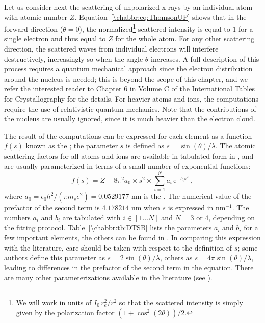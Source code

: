 Let us consider next the scattering of unpolarized x-rays by an individual atom with atomic number $Z$.  Equation~\ref{\chabbr:eq:ThomsonUP} shows that in the forward direction ($\theta=0$), the normalized\footnote{We will work in units of $I_0\,r_e^2/r^2$ so that the scattered intensity is simply given by the polarization factor $(1+\cos^2(2\theta))/2$.} scattered intensity is equal to $1$ for a single electron and thus equal to $Z$ for the whole atom.  For any other scattering direction, the scattered waves from individual electrons will interfere destructively, increasingly so when the angle $\theta$ increases.  A full description of this process requires a quantum mechanical approach since the electron distribution around the nucleus is needed; this is beyond the scope of this chapter, and we refer the interested reader to Chapter 6 in Volume C of the International Tables for Crystallography \cite{prince2004a} for the details.  For heavier atoms and ions, the computations require the use of relativistic quantum mechanics.  Note that the contributions of the nucleus are usually ignored, since it is much heavier than the electron cloud.

The result of the computations can be expressed for each element as a function $f(s)$ known as the ; the parameter $s$ is defined as $s=\sin(\theta)/\lambda$.  The atomic scattering factors for all atoms and ions are available in tabulated form in \cite{prince2004a}, and are usually parameterized in terms of a small number of exponential functions:
\begin{equation}
	f(s) = Z - 8\pi^2a_0\times s^2\times \sum_{i=1}^N a_i\,\mathrm{e}^{-b_i s^2}\ ,\label{\chabbr:eq:fs}
\end{equation}
where $a_0=\epsilon_0h^2/(\pi m_e e^2)=0.0529177$ nm is the . The numerical value of the prefactor of the second term is $4.178214$ nm when $s$ is expressed in nm$^{-1}$.  The numbers $a_i$ and $b_i$ are tabulated with $i\in[1\ldots N]$ and $N=3$ or $4$, depending on the fitting protocol.  Table~\ref{\chabbr:tb:DTSB} lists the parameters $a_i$ and $b_i$ for a few important elements, the others can be found in \cite{doyle1968a,smith1962a}.  In comparing this expression with the literature, care should be taken with respect to the definition of $s$; some authors define this parameter as $s=2\sin(\theta)/\lambda$, others as $s=4\pi\sin(\theta)/\lambda$, leading to differences in the prefactor of the second term in the equation.  There are many other parameterizations available in the literature (see \cite{kirkland1998a}).


